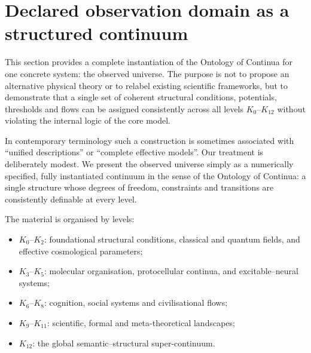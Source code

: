 
\section{Declared observation domain as a structured continuum}
\label{sec:observed-universe-continuum}

This section provides a complete instantiation of the Ontology of Continua
for one concrete system: the observed universe.
The purpose is not to propose an alternative physical theory or to
relabel existing scientific frameworks, but to demonstrate that a single
set of coherent structural conditions, potentials, thresholds and flows
can be assigned consistently across all levels \(K_0\)–\(K_{12}\) without
violating the internal logic of the core model.

In contemporary terminology such a construction is sometimes associated
with ``unified descriptions'' or ``complete effective models''.
Our treatment is deliberately modest.
We present the observed universe simply as a numerically specified,
fully instantiated continuum in the sense of the Ontology of Continua:
a single structure whose degrees of freedom, constraints and transitions
are consistently definable at every level.

The material is organised by levels:
\begin{itemize}
    \item \(K_0\)–\(K_2\): foundational structural conditions, classical and
          quantum fields, and effective cosmological parameters;
    \item \(K_3\)–\(K_5\): molecular organisation, protocellular continua,
          and excitable–neural systems;
    \item \(K_6\)–\(K_8\): cognition, social systems and civilisational flows;
    \item \(K_9\)–\(K_{11}\): scientific, formal and meta-theoretical
          landscapes;
    \item \(K_{12}\): the global semantic–structural super-continuum.
\end{itemize}

